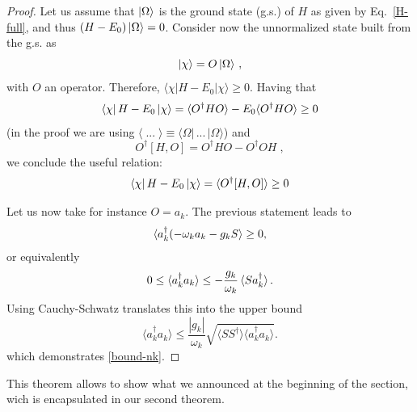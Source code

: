 \documentclass[notitlepage, prx, preprint, amsmath,superscriptaddress,amssymb]{revtex4-1}
\begin{document}
\begin{proof}
Let us assume that $\ket{\Omega}$ is the ground state (g.s.) of $H$ as given by Eq.\ \eqref{H-full}, and thus $(H-E_0)\ket{\Omega} = 0$.   Consider now the unnormalized state built from the g.s. as 
\begin{equation}
| \chi \rangle = O \ket{\Omega} \, ,
\end{equation}
with $O$ an operator.  Therefore, $\langle \chi | H - E_0 | \chi \rangle \geq 0$.   Having that
\begin{align}
\bra{\chi} H -E_0 \ket{\chi}  
= \langle O ^\dagger H O  \rangle  - E_0 
\langle  O ^\dagger H O  \rangle \geq 0 
\end{align}
(in the proof we are using $\langle \; ... \; \rangle \equiv \langle \Omega | \, ... \, | \Omega \rangle$)
and 
\begin{equation}
O^\dagger [H, O] = O^\dagger H O - O^\dagger O H \; ,
\end{equation}
we conclude the useful relation:
\begin{equation}
\bra{\chi} H -E_0 \ket{\chi}  
= \langle   O ^\dagger [H, O]  \rangle  \geq 0
\end{equation}


Let us now take for instance $O=a_k$. The previous statement leads to
\begin{align}
\braket{a_k^{\dagger} (-\omega_k a_k - g_k S }\geq 0,
\end{align}
or equivalently
\begin{equation}
0 \leq \braket{a_k^{\dagger}a_k} \leq -\frac{g_k}{\omega_k}\braket{ S a_k^{\dagger} }.
\end{equation}
Using Cauchy-Schwatz translates this into the upper bound
\begin{equation}
\langle a_k^\dagger a_k \rangle \leq \frac{|g_k|}{\omega_k} \sqrt{ \langle S S^\dagger \rangle \langle a_k^\dagger a_k \rangle}.
\end{equation}
which demonstrates \eqref{bound-nk}.
\end{proof}



This theorem allows to show what we announced at the beginning of the section, wich is encapsulated in our second theorem.
\end{document}
